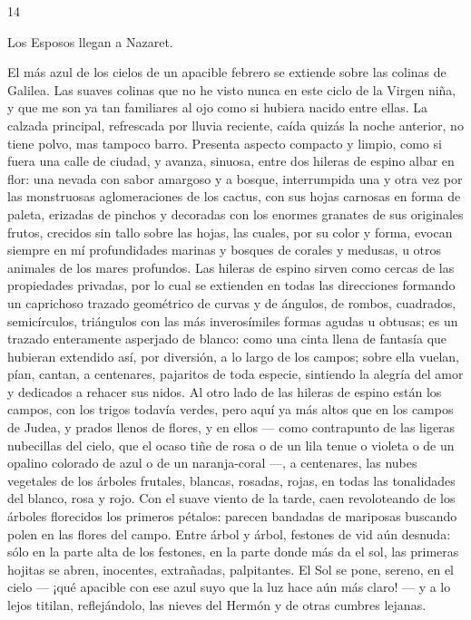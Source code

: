 \documentclass[12pt]{book} %
\begin{document}
14 
 
Los Esposos llegan a Nazaret. 
 
El más azul de los cielos de un apacible febrero se extiende sobre las colinas de Galilea. Las suaves colinas que no he 
visto nunca en este ciclo de la Virgen niña, y que me son ya tan familiares al ojo como si hubiera nacido entre ellas. 
La calzada principal, refrescada por lluvia reciente, caída quizás la noche anterior, no tiene polvo, mas tampoco barro. Presenta aspecto compacto y limpio, como si fuera una calle de ciudad, y avanza, sinuosa, entre dos hileras de espino albar en flor: una nevada con sabor amargoso y a bosque, interrumpida una y otra vez por las monstruosas aglomeraciones de los cactus, con sus hojas carnosas en forma de paleta, erizadas de pinchos y decoradas con los enormes granates de sus originales frutos, crecidos sin tallo sobre las hojas, las cuales, por su color y forma, evocan siempre en mí profundidades marinas y bosques de corales y medusas, u otros animales de los mares profundos. 
Las hileras de espino sirven como cercas de las propiedades privadas, por lo cual se extienden en todas las direcciones 
formando un caprichoso trazado geométrico de curvas y de ángulos, de rombos, cuadrados, semicírculos, triángulos con las más inverosímiles formas agudas u obtusas; es un trazado enteramente asperjado de blanco: como una cinta llena de fantasía que hubieran extendido así, por diversión, a lo largo de los campos; sobre ella vuelan, pían, cantan, a centenares, pajaritos de toda especie, sintiendo la alegría del amor y dedicados a rehacer sus nidos. Al otro lado de las hileras de espino están los campos, con los trigos todavía verdes, pero aquí ya más altos que en los campos de Judea, y prados llenos de flores, y en ellos — como contrapunto de las ligeras nubecillas del cielo, que el ocaso tiñe de rosa o de un lila tenue o  violeta o de un opalino colorado de azul o de un naranja-coral —, a centenares, las nubes vegetales de los árboles frutales, blancas, rosadas, rojas, en todas las tonalidades del blanco, rosa y rojo. 
Con el suave viento de la tarde, caen revoloteando de los árboles florecidos los primeros pétalos: parecen bandadas de 
mariposas buscando polen en las flores del campo. Entre árbol y árbol, festones de vid aún desnuda: sólo en la parte alta de los festones, en la parte donde más da el sol, las primeras hojitas se abren, inocentes, extrañadas, palpitantes. 
El Sol se pone, sereno, en el cielo — ¡qué apacible con ese azul suyo que la luz hace aún más claro! — y a lo lejos titilan, 
reflejándolo, las nieves del Hermón y de otras cumbres lejanas. 
\end{document}
